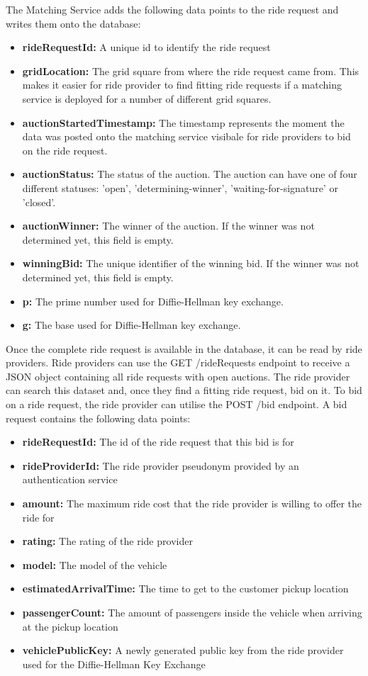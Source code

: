 The Matching Service adds the following data points to the ride request and writes them onto the database:

\begin{itemize}
    \item \textbf{rideRequestId:} A unique id to identify the ride request
    \item \textbf{gridLocation:} The grid square from where the ride request came from. This makes it easier for ride provider to find fitting ride requests if a matching service is deployed for a number of different grid squares. 
    \item \textbf{auctionStartedTimestamp:} The timestamp represents the moment the data was posted onto the matching service visibale for ride providers to bid on the ride request. 
    \item \textbf{auctionStatus:} The status of the auction. The auction can have one of four different statuses: 'open', 'determining-winner', 'waiting-for-signature' or 'closed'. 
    \item \textbf{auctionWinner:} The winner of the auction. If the winner was not determined yet, this field is empty.
    \item \textbf{winningBid:} The unique identifier of the winning bid. If the winner was not determined yet, this field is empty.
    \item \textbf{p:} The prime number used for Diffie-Hellman key exchange.
    \item \textbf{g:} The base used for Diffie-Hellman key exchange.
\end{itemize}

Once the complete ride request is available in the database, it can be read by ride providers. Ride providers can use the GET /rideRequests endpoint to receive a JSON object containing all ride requests with open auctions. The ride provider can search this dataset and, once they find a fitting ride request, bid on it.
To bid on a ride request, the ride provider can utilise the POST /bid endpoint. A bid request contains the following data points:

\begin{itemize}
    \item \textbf{rideRequestId:} The id of the ride request that this bid is for
    \item \textbf{rideProviderId:} The ride provider pseudonym provided by an authentication service
    \item \textbf{amount:} The maximum ride cost that the ride provider is willing to offer the ride for
    \item \textbf{rating:} The rating of the ride provider
    \item \textbf{model:} The model of the vehicle
    \item \textbf{estimatedArrivalTime:} The time to get to the customer pickup location
    \item \textbf{passengerCount:} The amount of passengers inside the vehicle when arriving at the pickup location
    \item \textbf{vehiclePublicKey:} A newly generated public key from the ride provider used for the Diffie-Hellman Key Exchange 
\end{itemize}

